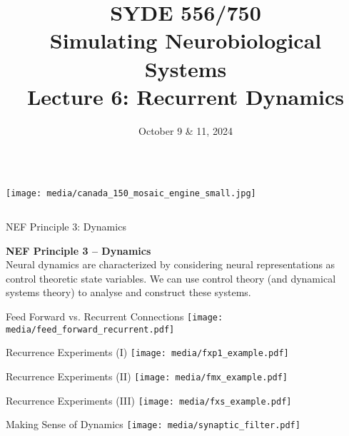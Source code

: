 \documentclass[handout,aspectratio=169]{beamer}
\date{October 9 \& 11, 2024}
\title{SYDE 556/750 \\ Simulating Neurobiological Systems \\ Lecture 6: Recurrent Dynamics}
\begin{document}
	
	\begin{frame}{}
		\vspace{0.5cm}
		\begin{columns}[c]
			\MakeTitle
			\texttt{[image: media/canada\_150\_mosaic\_engine\_small.jpg]}
		\end{columns}
	\end{frame}

  \begin{frame}{NEF Principle 3: Dynamics}
		\centering
		\begin{mdframed}
			\textbf{NEF Principle 3 -- Dynamics}\\
			Neural dynamics are characterized by considering neural representations as control theoretic state variables. We can use control theory (and dynamical systems theory) to analyse and construct these systems.
		\end{mdframed}
	\end{frame}

	\begin{frame}{Feed Forward vs. Recurrent Connections}
		\centering
		\texttt{[image: media/feed\_forward\_recurrent.pdf]}
	\end{frame}

	\begin{frame}{Recurrence Experiments (I)}
		\centering
		\texttt{[image: media/fxp1\_example.pdf]}
	\end{frame}

	\begin{frame}{Recurrence Experiments (II)}
		\centering
		\texttt{[image: media/fmx\_example.pdf]}
	\end{frame}

	\begin{frame}{Recurrence Experiments (III)}
		\centering
		\texttt{[image: media/fxs\_example.pdf]}
	\end{frame}


	\begin{frame}{Making Sense of Dynamics}
		\centering
		\texttt{[image: media/synaptic\_filter.pdf]} 		
	\end{frame}

\end{document}
